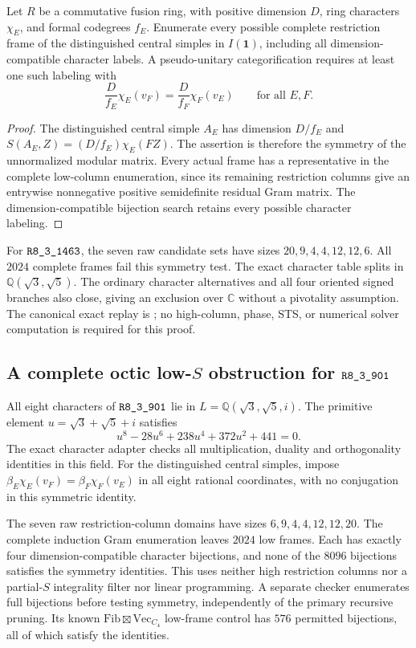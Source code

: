 \begin{proposition}
Let $R$ be a commutative fusion ring, with positive dimension $D$, ring
characters $\chi_E$, and formal codegrees $f_E$. Enumerate every possible
complete restriction frame of the distinguished central simples in
$I(\mathbf1)$, including all dimension-compatible character labels.
A pseudo-unitary categorification requires at least one such labeling
with
\[
  \frac{D}{f_E}\chi_E(v_F)=\frac{D}{f_F}\chi_F(v_E)
  \qquad\text{for all }E,F.
\]
\end{proposition}
\begin{proof}
The distinguished central simple $A_E$ has dimension $D/f_E$ and
$S(A_E,Z)=(D/f_E)\chi_E(FZ)$\cite[Lemma~4.3 and Corollary~4.5]{DeshpandeCenter}. The assertion is therefore the symmetry
of the unnormalized modular matrix. Every actual frame has a
representative in the complete low-column enumeration, since its
remaining restriction columns give an entrywise nonnegative positive
semidefinite residual Gram matrix. The dimension-compatible bijection
search retains every possible character labeling.
\end{proof}

For $\sha{R8_3_1463}$, the seven raw candidate sets have sizes
$20,9,4,4,12,12,6$. All $2024$ complete frames fail this symmetry test.
The exact character table splits in $\mathbb Q(\sqrt3,\sqrt5)$.
The ordinary character alternatives and all four oriented signed
branches also close, giving an exclusion over $\mathbb C$ without a
pivotality assumption. The canonical exact replay is
; no high-column,
phase, STS, or numerical solver computation is required for this proof.

\subsection{A complete octic low-$S$ obstruction for $\sha{R8_3_901}$}
\label{sec:rank8-octic-low-S}
All eight characters of $\sha{R8_3_901}$ lie in
$L=\mathbb Q(\sqrt3,\sqrt5,i)$. The primitive element
$u=\sqrt3+\sqrt5+i$ satisfies
\[
 u^8-28u^6+238u^4+372u^2+441=0.
\]
The exact character adapter checks all multiplication, duality and
orthogonality identities in this field. For the distinguished central
simples, impose
$\beta_E\chi_E(v_F)=\beta_F\chi_F(v_E)$ in all eight rational coordinates,
with no conjugation in this symmetric identity.

The seven raw restriction-column domains have sizes
$6,9,4,4,12,12,20$. The complete induction Gram enumeration leaves
$2024$ low frames. Each has exactly four dimension-compatible character
bijections, and none of the $8096$ bijections satisfies the symmetry
identities. This uses neither high restriction columns nor a
partial-$S$ integrality filter nor linear programming. A separate
checker enumerates full bijections before testing symmetry, independently
of the primary recursive pruning. Its known
$\mathrm{Fib}\boxtimes\mathrm{Vec}_{C_4}$ low-frame control has $576$
permitted bijections, all of which satisfy the identities.

